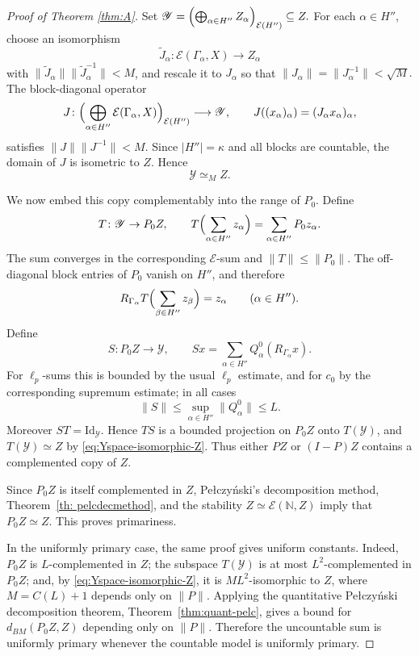 \documentclass[11pt]{amsart}
\theoremstyle{plain}
\theoremstyle{definition}
\numberwithin{equation}{section}
\newcommand{\norm}[1]{\lVert #1 \rVert}
\newcommand{\abs}[1]{\left|#1\right|}
\newcommand{\N}{\mathbb{N}}
\newcommand{\Yspace}{\mathscr Y}
\newcommand{\Id}{\mathrm{Id}}
\renewcommand{\le}{\leqslant}
\begin{document}
\begin{proof}[Proof of Theorem \ref{thm:A}]
Set
\(
    \Yspace=\Bigl(\bigoplus_{\alpha\in H''}Z_\alpha\Bigr)_{\mathcal E(H'')}
    \subseteq Z.
\)
For each $\alpha\in H''$, choose an isomorphism
\[
    \widetilde J_\alpha\colon \mathcal E(\Gamma_\alpha,X)\to Z_\alpha
\]
with $\norm{\widetilde J_\alpha}\norm{\widetilde J_\alpha^{-1}}<M$, and rescale it to $J_\alpha$ so that
\(
    \norm{J_\alpha}=\norm{J_\alpha^{-1}}<\sqrt M.
\)
The block-diagonal operator
\[
    J\colon
    \Bigl(\bigoplus_{\alpha\in H''}\mathcal E(\Gamma_\alpha,X)\Bigr)_{\mathcal E(H'')}
    \longrightarrow \Yspace,
    \qquad
    J((x_\alpha)_\alpha)=(J_\alpha x_\alpha)_\alpha,
\]
satisfies $\norm J\norm{J^{-1}}<M$.  Since $\abs{H''}=\kappa$ and all blocks are countable, the domain of $J$ is isometric to $Z$.  Hence
\begin{equation}\label{eq:Yspace-isomorphic-Z}
    \Yspace\simeq_M Z.
\end{equation}

We now embed this copy complementably into the range of $P_0$.  Define
\[
    T\colon\Yspace\to P_0Z,
    \qquad
    T\Bigl(\sum_{\alpha\in H''}z_\alpha\Bigr)=\sum_{\alpha\in H''}P_0z_\alpha.
\]
The sum converges in the corresponding $\mathcal E$-sum and $\norm T\le\norm{P_0}$.  The off-diagonal block entries of $P_0$ vanish on $H''$, and therefore
\[
    R_{\Gamma_\alpha}T\Bigl(\sum_{\beta\in H''}z_\beta\Bigr)=z_\alpha
    \qquad(\alpha\in H'').
\]
Define
\[
    S\colon P_0Z\to\Yspace,
    \qquad
    Sx=\sum_{\alpha\in H''}Q_\alpha^0(R_{\Gamma_\alpha}x).
\]
For $\ell_p$-sums this is bounded by the usual $\ell_p$ estimate, and for $c_0$ by the corresponding supremum estimate; in all cases
\[
    \norm S\le \sup_{\alpha\in H''}\norm{Q_\alpha^0}\le L.
\]
Moreover $ST=\Id_{\Yspace}$.  Hence $TS$ is a bounded projection on $P_0Z$ onto $T(\Yspace)$, and $T(\Yspace)\simeq Z$ by \eqref{eq:Yspace-isomorphic-Z}.  Thus either $PZ$ or $(I-P)Z$ contains a complemented copy of $Z$.

Since $P_0Z$ is itself complemented in $Z$, Pe{\l}czy\'nski's decomposition method, Theorem~\ref{th: pelcdecmethod}, and the stability $Z\simeq\mathcal E(\N,Z)$ imply that $P_0Z\simeq Z$.  This proves primariness.

In the uniformly primary case, the same proof gives uniform constants.  Indeed, $P_0Z$ is $L$-complemented in $Z$; the subspace $T(\Yspace)$ is at most $L^2$-complemented in $P_0Z$; and, by \eqref{eq:Yspace-isomorphic-Z}, it is $M L^2$-isomorphic to $Z$, where $M=C(L)+1$ depends only on $\norm P$.  Applying the quantitative Pe{\l}czy\'nski decomposition theorem, Theorem~\ref{thm:quant-pelc}, gives a bound for $d_{BM}(P_0Z,Z)$ depending only on $\norm P$.  Therefore the uncountable sum is uniformly primary whenever the countable model is uniformly primary.
\end{proof}
\end{document}
